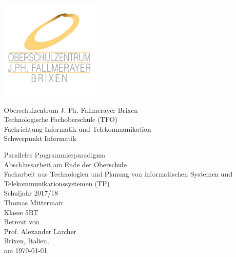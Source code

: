 
\begin{titlepage}
	\begin{center}
		\includegraphics[height=50mm]{Abbildungen/Fallmerayer_Logo.jpg} \\[3mm]
		\vspace{1cm}

		\begin{large}
			Oberschulzentrum J. Ph. Fallmerayer Brixen\\[5mm]
			Technologische Fachoberschule (TFO)\\[2mm]
			Fachrichtung Informatik und Telekommunikation\\
			Schwerpunkt Informatik\\[20mm]
		\end{large}

		{\LARGE Paralleles Programmierparadigma\\[9mm]}
		Abschlussarbeit am Ende der Oberschule\\[2mm]
		Facharbeit aus Technologien und Planung von informatischen Systemen und Telekommunikationssystemen (TP)\\[2mm]
		Schuljahr 2017/18\\[9mm]

		Thomas Mittermair\\[2mm]
		Klasse 5BT\\[9mm]

		Betreut von\\
		Prof. Alexander Larcher\\[7mm]

		Brixen, Italien,\\
		am \today
	\end{center}
\end{titlepage}